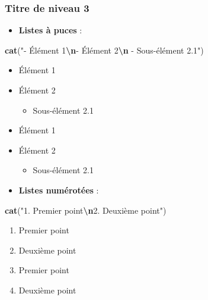\documentclass[
]{article}
\newenvironment{Shaded}{\begin{snugshade}}{\end{snugshade}}
\newcommand{\FunctionTok}[1]{\textcolor[rgb]{0.13,0.29,0.53}{\textbf{#1}}}
\newcommand{\NormalTok}[1]{#1}
\newcommand{\SpecialCharTok}[1]{\textcolor[rgb]{0.81,0.36,0.00}{\textbf{#1}}}
\newcommand{\StringTok}[1]{\textcolor[rgb]{0.31,0.60,0.02}{#1}}
\providecommand{\tightlist}{%
  \setlength{\itemsep}{0pt}\setlength{\parskip}{0pt}}
\begin{document}
\hypertarget{titre-de-niveau-3}{%
\subsubsection{Titre de niveau 3}\label{titre-de-niveau-3}}

\begin{itemize}
\tightlist
\item
  \textbf{Listes à puces} :
\end{itemize}

\begin{Shaded}
\begin{Highlighting}[]
\FunctionTok{cat}\NormalTok{(}\StringTok{"{-} Élément 1}\SpecialCharTok{\textbackslash{}n}\StringTok{{-} Élément 2}\SpecialCharTok{\textbackslash{}n}\StringTok{  {-} Sous{-}élément 2.1"}\NormalTok{)}
\end{Highlighting}
\end{Shaded}

\begin{itemize}
\tightlist
\item
  Élément 1
\item
  Élément 2

  \begin{itemize}
  \tightlist
  \item
    Sous-élément 2.1
  \end{itemize}
\item
  Élément 1
\item
  Élément 2

  \begin{itemize}
  \tightlist
  \item
    Sous-élément 2.1
  \end{itemize}
\item
  \textbf{Listes numérotées} :
\end{itemize}

\begin{Shaded}
\begin{Highlighting}[]
\FunctionTok{cat}\NormalTok{(}\StringTok{"1. Premier point}\SpecialCharTok{\textbackslash{}n}\StringTok{2. Deuxième point"}\NormalTok{)}
\end{Highlighting}
\end{Shaded}

\begin{enumerate}
\def\labelenumi{\arabic{enumi}.}
\item
  Premier point
\item
  Deuxième point
\item
  Premier point
\item
  Deuxième point
\end{enumerate}
\end{document}
